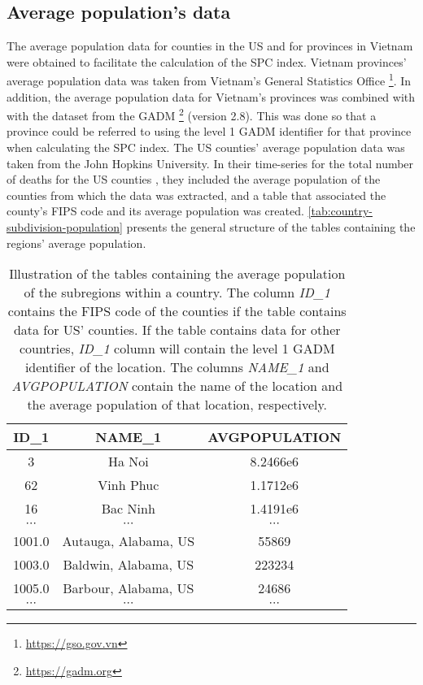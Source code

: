 \subsection{Average population's data}

The average population data for counties in the \gls{US} and for provinces in Vietnam were obtained to facilitate the calculation of the \gls{SPC} index.
Vietnam provinces' average population data was taken from Vietnam's General Statistics Office \footnote{\url{https://gso.gov.vn}}.
In addition, the average population data for Vietnam's provinces was combined with with the dataset from the \gls{GADM} \footnote{\url{https://gadm.org}} (version 2.8).
This was done so that a province could be referred to using the level 1 \gls{GADM} identifier for that province when calculating the \gls{SPC} index.
The \gls{US} counties' average population data was taken from the John Hopkins University.
In their time-series for the total number of deaths for the \gls{US} counties \cite{dongInteractiveWebbasedDashboard2020}, they included the average population of the counties from which the data was extracted, and a table that associated the county's \gls{FIPS} code and its average population was created.
\autoref{tab:country-subdivision-population} presents the general structure of the tables containing the regions' average population.

\begin{table}[h]
\centering
\begin{tabular}{| c | c | c |}
    ID\_1 & NAME\_1 & AVGPOPULATION \\
    \hline\hline
    3 & Ha Noi & 8.2466e6 \\
    \hline
    62 & Vinh Phuc & 1.1712e6 \\
    \hline
    16 & Bac Ninh & 1.4191e6 \\
    \hline
    $\cdots$ & $\cdots$ & $\cdots$ \\
    \hline
    1001.0 & Autauga, Alabama, US & 55869 \\
    \hline
    1003.0 & Baldwin, Alabama, US & 223234 \\
    \hline
    1005.0 & Barbour, Alabama, US & 24686 \\
    \hline
    $\cdots$ & $\cdots$ & $\cdots$ \\
\end{tabular}
\caption{Illustration of the tables containing the average population of the subregions within a country. The column \textit{ID\_1} contains the FIPS code of the counties if the table contains data for US' counties. If the table contains data for other countries, \textit{ID\_1} column will contain the level 1 GADM identifier of the location. The columns \textit{NAME\_1} and \textit{AVGPOPULATION} contain the name of the location and the average population of that location, respectively.}
\label{tab:country-subdivision-population}
\end{table}